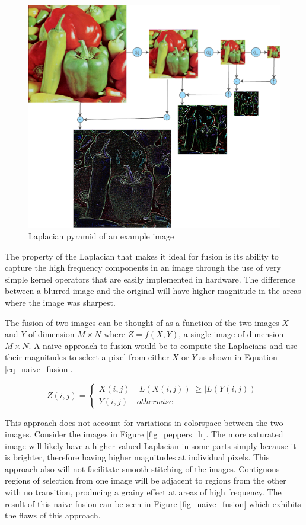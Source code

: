 \documentclass{article}
\begin{document}
\begin{figure}[h]
	\centering
	\includegraphics[width=\textwidth]{figures/peppers/laplacian_pyramid}
	\caption{Laplacian pyramid of an example image}
	\label{fig_pepper_laplacian_pyramid}
\end{figure}

The property of the Laplacian that makes it ideal for fusion is its ability to capture the high frequency components in an image through the use of very simple kernel operators that are easily implemented in hardware. The difference between a blurred image and the original will have higher magnitude in the areas where the image was sharpest.

The fusion of two images can be thought of as a function of the two images $X$ and $Y$ of dimension $M \times N$ where $Z = f(X, Y)$, a single image of dimension $M \times N$. A naive approach to fusion would be to compute the Laplacians and use their magnitudes to select a pixel from either $X$ or $Y$ as shown in Equation \ref{eq_naive_fusion}.

\begin{equation}
Z(i,j)=
\begin{cases}
X(i,j) & |L(X(i,j))| \ge |L(Y(i,j))| \\
Y(i,j) & otherwise
\end{cases}
\label{eq_naive_fusion}
\end{equation}

This approach does not account for variations in colorspace between the two images. Consider the images in Figure \ref{fig_peppers_lr}. The more saturated image will likely have a higher valued Laplacian in some parts simply because it is brighter, therefore having higher magnitudes at individual pixels. This approach also will not facilitate smooth stitching of the images. Contiguous regions of selection from one image will be adjacent to regions from the other with no transition, producing a grainy effect at areas of high frequency. The result of this naive fusion can be seen in Figure \ref{fig_naive_fusion} which exhibits the flaws of this approach.
\end{document}
